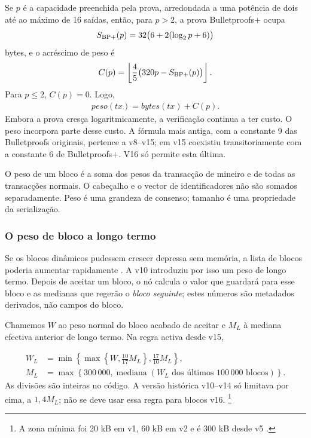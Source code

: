 Se $p$ é a capacidade preenchida pela prova, arredondada a uma potência de
dois até ao máximo de 16 saídas, então, para $p>2$, a prova Bulletproofs+ ocupa
\begin{align*}
S_{\rm BP+}(p)=32\bigl(6+2(\log_2p+6)\bigr)
\end{align*}
bytes, e o acréscimo de peso é
\begin{align*}
C(p)=\left\lfloor\frac45\bigl(320p-S_{\rm BP+}(p)\bigr)\right\rfloor.
\end{align*}
Para $p\leq2$, $C(p)=0$. Logo,
\begin{align*}
\mathit{peso(tx)}=\mathit{bytes(tx)}+C(p).
\end{align*}
Embora a prova cresça logaritmicamente, a verificação continua a ter custo. O
peso incorpora parte desse custo. A fórmula mais antiga, com a constante 9 das Bulletproofs
originais, pertence a v8--v15; em v15 coexistiu transitoriamente com a
constante 6 de Bulletproofs+. V16 só permite esta última.

O peso de um bloco é a soma dos pesos da transacção de mineiro e de todas as
transacções normais. O cabeçalho e o vector de identificadores não são somados
separadamente. Peso é uma grandeza de consenso; tamanho é uma propriedade da
serialização.

\subsubsection*{O peso de bloco a longo termo}

Se os blocos dinâmicos pudessem crescer depressa sem memória, a lista de
blocos poderia aumentar rapidamente \cite{big-bang-github}. A v10
introduziu por isso um peso de longo termo. Depois de aceitar um bloco, o nó
calcula o valor que guardará para esse bloco e as medianas que regerão o
\emph{bloco seguinte}; estes números são metadados derivados, não campos do
bloco.

%
Chamemos $W$ ao peso normal do bloco acabado de aceitar e $M_L$ à mediana
efectiva anterior de longo termo. Na regra activa desde v15,

\begin{align*}
W_L&=\min\left\{\max\left\{W,\frac{10}{17}M_L\right\},
                         \frac{17}{10}M_L\right\},\\
M_L&=\max\left\{300\,000,
   \operatorname{mediana}(W_L\text{ dos últimos }100\,000\text{ blocos})
   \right\}.
\end{align*}
As divisões são inteiras no código. A versão histórica v10--v14 só limitava
por cima, a $1{,}4M_L$; não se deve usar essa regra para blocos v16.
\footnote{A zona mínima foi 20 kB em v1, 60 kB em v2 e é 300 kB desde v5
\cite{monero-0.9.3,monero-v5}.}

